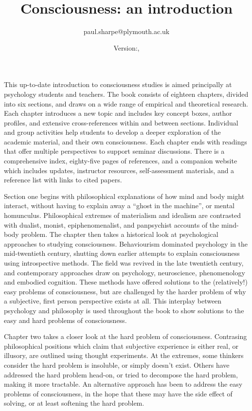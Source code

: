 \documentclass[a4paper]{article}
\begin{document}
\title{Consciousness: an introduction}
\date{Version:\gitRels{}, \gitAuthorDate{} }
\author{paul.sharpe@plymouth.ac.uk}

\maketitle

This up-to-date introduction to consciousness studies is aimed principally at
psychology students and teachers. The book consists of eighteen chapters,
divided into six sections, and draws on a wide range of empirical and
theoretical research. Each chapter introduces a new topic and includes key
concept boxes, author profiles, and extensive cross-references within and
between sections. Individual and group activities help students to develop a
deeper exploration of the academic material, and their own consciousness. Each
chapter ends with readings that offer multiple perspectives to support seminar
discussions. There is a comprehensive index, eighty-five pages of references,
and a companion website which includes updates, instructor resources,
self-assessment materials, and a reference list with links to cited papers.

Section one begins with philosophical explanations of how mind and body might
interact, without having to explain away a ``ghost in the machine'', or mental
homunculus. Philosophical extremes of materialism and idealism are contrasted
with dualist, monist, epiphenomenalist, and panpsychist accounts of the
mind-body problem. The chapter then takes a historical look at psychological
approaches to studying consciousness. Behaviourism dominated psychology in the
mid-twentieth century, shutting down earlier attempts to explain consciousness
using introspective methods. The field was revived in the late twentieth
century, and contemporary approaches draw on psychology, neuroscience,
phenomenology and embodied cognition. These methods have offered solutions to
the (relatively!) easy problems of consciousness, but are challenged by the
harder problem of why a subjective, first person perspective exists at all.
This interplay between psychology and philosophy is used throughout the book
to show solutions to the easy and hard problems of consciousness.

Chapter two takes a closer look at the hard problem of consciousness.
Contrasing philosophical positions which claim that subjective experience is
either real, or illusory, are outlined using thought experiments. At the
extremes, some thinkers consider the hard problem is insoluble, or simply
doesn’t exist. Others have addressed the hard problem head-on, or tried to
decompose the hard problem, making it more tractable. An alternative approach
has been to address the easy problems of consciousness, in the hope that these
may have the side effect of solving, or at least softening the hard problem.
\end{document}
